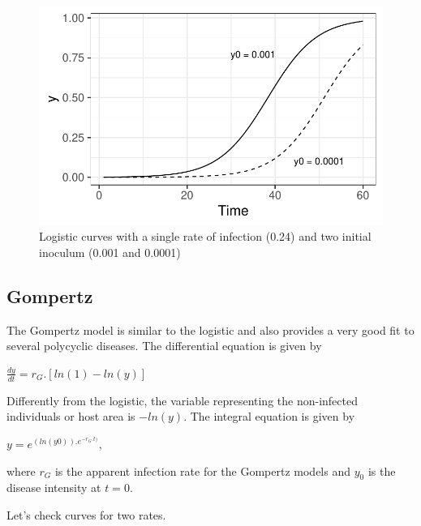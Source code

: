 \documentclass[
  letterpaper,
  DIV=11,
  numbers=noendperiod]{scrreprt}
\begin{document}
\begin{figure}[H]

{\centering \includegraphics{temporal-models_files/figure-pdf/fig-log2-1.pdf}

}

\caption{\label{fig-log2}Logistic curves with a single rate of infection
(0.24) and two initial inoculum (0.001 and 0.0001)}

\end{figure}

\hypertarget{gompertz}{%
\subsection{Gompertz}\label{gompertz}}

The Gompertz model is similar to the logistic and also provides a very
good fit to several polycyclic diseases. The differential equation is
given by

\(\frac{dy}{dt} = r_G.[ln(1) - ln(y)]\)

Differently from the logistic, the variable representing the
non-infected individuals or host area is \(-ln(y)\). The integral
equation is given by

\(y = e^{(ln(y0)).{e^{-r_G.t)}}}\),

where \(r_G\) is the apparent infection rate for the Gompertz models and
\(y_0\) is the disease intensity at \(t = 0\).

Let's check curves for two rates.
\end{document}
